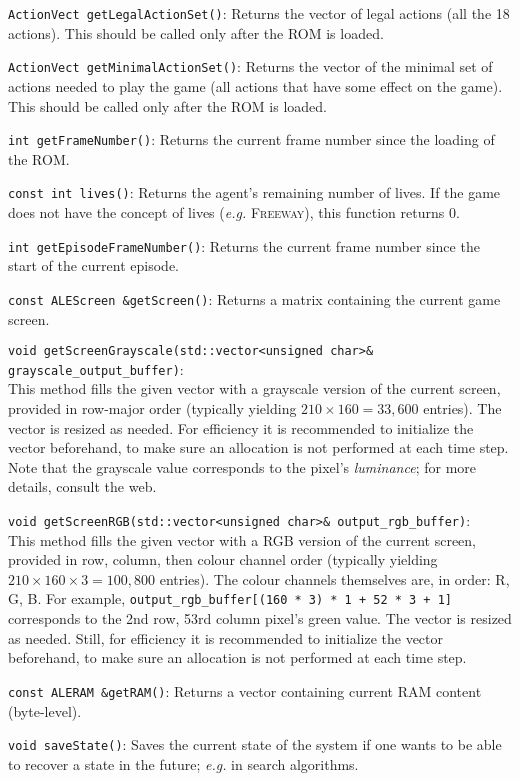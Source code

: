 \documentclass[12pt]{article}
\begin{document}
  \verb+ActionVect getLegalActionSet()+: Returns the vector of legal actions (all the 18 actions).
  This should be called only after the ROM is loaded.
  
  \verb+ActionVect getMinimalActionSet()+: Returns the vector of the minimal set of actions
  needed to play the game (all actions that have some effect on the game). This should be
  called only after the ROM is loaded.
  
  \verb+int getFrameNumber()+: Returns the current frame number since the loading of the ROM.
  
  \verb+const int lives()+: Returns the agent's remaining number of lives. If the game does not have 
  the concept of lives (\emph{e.g.} \textsc{Freeway}), this function returns 0.
  
  \verb+int getEpisodeFrameNumber()+: Returns the current frame number since the start of the
  current episode.
  
  \verb+const ALEScreen &getScreen()+: Returns a matrix containing the current game screen.
  
  \verb+void getScreenGrayscale(std::vector<unsigned char>& grayscale_output_buffer)+: \\
  This method fills the given vector with a grayscale version of the current screen, provided
  in row-major order (typically yielding $210 \times 160 = 33,600$ entries). The vector is
  resized as needed. For efficiency it is recommended to initialize the vector beforehand, to 
  make sure an allocation is not performed at each time step. Note that the grayscale value
  corresponds to the pixel's \emph{luminance}; for more details, consult the web.
  
  \verb+void getScreenRGB(std::vector<unsigned char>& output_rgb_buffer)+:\\ 
  This method fills the given vector with a RGB version of the current screen, provided
  in row, column, then colour channel order (typically yielding $210 \times 160 \times 3 = 
  100,800$ entries). The colour channels themselves are, in order: R, G, B. For example, \verb#output_rgb_buffer[(160 * 3) * 1 + 52 * 3 + 1]# corresponds to the 2nd row, 53rd column pixel's green
  value. The vector is resized as needed. Still, for efficiency it is recommended to initialize
  the vector beforehand, to make sure an allocation is not performed at each time step.
  
  \verb+const ALERAM &getRAM()+: Returns a vector containing current RAM content (byte-level).
  
  \verb+void saveState()+: Saves the current state of the system if one wants to be able to recover 
  a state in the future; \emph{e.g.} in search algorithms.
  
\end{document}
